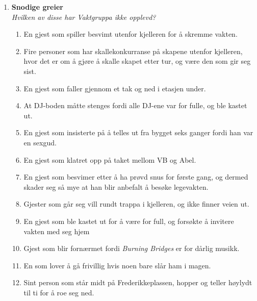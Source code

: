 \documentclass[11pt]{article}
\begin{document}
\begin{enumerate}
\begin{enumerate}
    \end{enumerate}

\item \textbf{Snodige greier} \vspace{1mm} \\
\textit{Hvilken av disse har Vaktgruppa ikke opplevd?}
    \begin{enumerate}
\item En gjest som spiller besvimt utenfor kjelleren for å skremme vakten.
\item Fire personer som har skallekonkurranse på skapene utenfor kjelleren, hvor det er om å gjøre å skalle skapet etter tur, og være den som gir seg sist.
\item En gjest som faller gjennom et tak og ned i etasjen under.
\item At DJ-boden måtte stenges fordi alle DJ-ene var for fulle, og ble kastet ut.
\item En gjest som insisterte på å telles ut fra bygget seks ganger fordi han var en sexgud.
\item En gjest som klatret opp på taket mellom VB og Abel.
\item En gjest som besvimer etter å ha prøvd snus for første gang, og dermed skader seg så mye at han blir anbefalt å besøke legevakten.
\item Gjester som går seg vill rundt trappa i kjelleren, og ikke finner veien ut.
\item En gjest som ble kastet ut for å være for full, og forsøkte å invitere vakten med seg hjem
\item Gjest som blir fornærmet fordi \textit{Burning Bridges} er for dårlig musikk.
\item En som lover å gå frivillig hvis noen bare slår ham i magen.
\item Sint person som står midt på Frederikkeplassen, hopper og teller høylydt til ti for å roe seg ned.
    \end{enumerate}


\end{enumerate}
\end{document}
